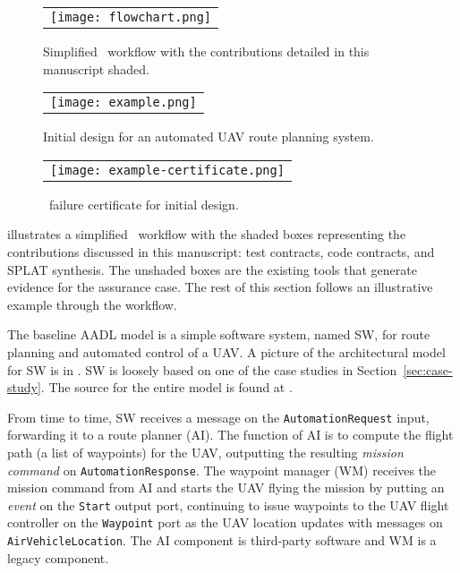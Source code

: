 \begin{figure*}
  \begin{center}
    \begin{tabular}{c}
      \texttt{[image: flowchart.png]} \\
    \end{tabular}
  \end{center}
\caption{Simplified \brfcs\ workflow with the contributions detailed in this manuscript shaded.}
\label{fig:flowchart}
\end{figure*}

\begin{figure*}[h]
  \begin{center}
    \begin{tabular}{c}
      \texttt{[image: example.png]}
    \end{tabular}
  \end{center}
\caption{Initial design for an automated UAV route planning system.}
\label{fig:example}
\end{figure*}

\begin{figure}
  \begin{center}
    \begin{tabular}{c}
      \texttt{[image: example-certificate.png]} \\
    \end{tabular}
  \end{center}
\caption{\agr\ failure certificate for initial design.}
\label{fig:example-certificate}
\end{figure}

 illustrates a simplified \brfcs\ workflow with the shaded boxes representing the contributions discussed in this manuscript: test contracts, code contracts, and SPLAT synthesis.
The unshaded boxes are the existing tools that generate evidence for the assurance case.
The rest of this section follows an illustrative example through the workflow.

The baseline AADL model is a simple software system, named SW, for route planning
and automated control of a UAV. A picture of the architectural
model for SW is in . SW is loosely based on one of
the case studies in Section~\ref{sec:case-study}.  The source for the
entire model is found at \cite{repo}.

From time to time, SW receives a message on the \texttt{AutomationRequest} input,
forwarding it to a route planner (AI). The function of AI is to 
compute the flight path (a list of waypoints) for the UAV, outputting
the resulting \emph{mission command} on \texttt{AutomationResponse}.
The waypoint manager (WM) receives the mission command from AI and
starts the UAV flying the mission by putting an \emph{event} on the
\texttt{Start} output port, continuing to issue waypoints to the UAV
flight controller on the \texttt{Waypoint} port as the UAV location
updates with messages on \texttt{AirVehicleLocation}.
The AI component is third-party
software and WM is a legacy component.

